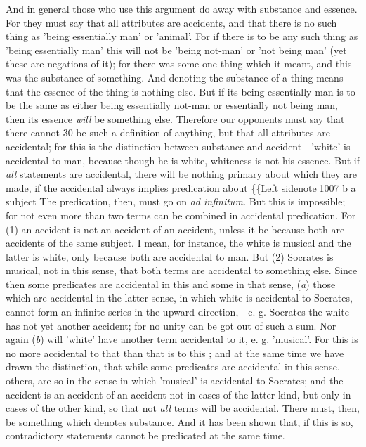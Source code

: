 And in general those who use this argument do away with substance and essence. For they must say that all attributes are accidents, and that there is no such thing as 'being essentially man' or 'animal'. For if there is to be any such thing as 'being essentially man' this will not be 'being not-man' or 'not being man' (yet these are negations of it); for there was some one thing which it meant, and this was the substance of something. And denoting the substance of a thing means that the essence of the thing is nothing else. But if its being essentially man is to be the same as either being essentially not-man or essentially not being man, then its essence \emph{will} be something else. Therefore our opponents must say that there cannot 30 be such a definition of anything, but that all attributes are accidental; for this is the distinction between substance and accident—'white' is accidental to man, because though he is white, whiteness is not his essence. But if \emph{all} statements are accidental, there will be nothing primary about which they are made, if the accidental always implies predication about \{\{Left sidenote|1007 b a subject The predication, then, must go on \emph{ad infinitum.} But this is impossible; for not even more than two terms can be combined in accidental predication. For (1) an accident is not an accident of an accident, unless it be because both are accidents of the same subject. I mean, for instance, the white is musical and the latter is white, only because both are accidental to man. But (2) Socrates is musical, not in this sense, that both terms are accidental to something else. Since then some predicates are accidental in this and some in that sense, (\emph{a}) those which are accidental in the latter sense, in which white is accidental to Socrates, cannot form an infinite series in the upward direction,—e. g. Socrates the white has not yet another accident; for no unity can be got out of such a sum. Nor again (\emph{b}) will 'white' have another term accidental to it, e. g. 'musical'. For this is no more accidental to that than that is to this ; and at the same time we have drawn the distinction, that while some predicates are accidental in this sense, others, are so in the sense in which 'musical' is accidental to Socrates; and the accident is an accident of an accident not in cases of the latter kind, but only in cases of the other kind, so that not \emph{all} terms will be accidental. There must, then, be something which denotes substance. And it has been shown that, if this is so, contradictory statements cannot be predicated at the same time.

